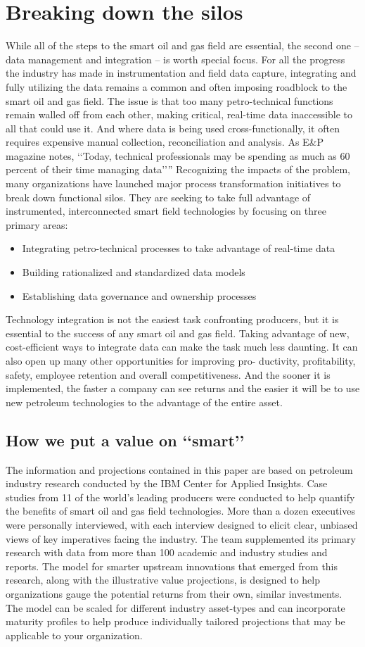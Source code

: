 \documentclass[twocolumn]{article}
\newcommand{\bi}{\begin{itemize}}
\newcommand{\ei}{\end{itemize}}
\newcommand{\ii}{\item}
\begin{document}
\section{Breaking down the silos}
While all of the steps to the smart oil and gas field are essential, the second one – data management and integration – is worth special focus. For all the progress the industry has made in instrumentation and field data capture, integrating and fully utilizing the data remains a common and often imposing roadblock to the smart oil and gas field.
The issue is that too many petro-technical functions remain walled off from each other, making critical, real-time data inaccessible to all that could use it. And where data is being used cross-functionally, it often requires expensive manual collection, reconciliation and analysis. As E\&P magazine notes, \lq\lq{}Today, technical professionals may be spending as much as 60 percent of their time managing data\rq\rq{}”
Recognizing the impacts of the problem, many organizations have launched major process transformation initiatives to break down functional silos. They are seeking to take full advantage of instrumented, interconnected smart field technologies by focusing on three primary areas:
\bi
\ii Integrating petro-technical processes to take advantage of real-time data
\ii  Building rationalized and standardized data models
\ii  Establishing data governance and ownership processes
\ei
Technology integration is not the easiest task confronting producers, but it is essential to the success of any smart oil and gas field. Taking advantage of new, cost-efficient ways
to integrate data can make the task much less daunting. It can also open up many other opportunities for improving pro- ductivity, profitability, safety, employee retention and overall competitiveness. And the sooner it is implemented, the faster a company can see returns and the easier it will be to use new petroleum technologies to the advantage of the entire asset.


\subsection{How we put a value on \lq\lq{}smart\rq\rq{}}
The information and projections contained in this paper are based on petroleum industry research conducted by the IBM Center for Applied Insights. Case studies from 11 of the world’s leading producers were conducted to help quantify the benefits of smart oil and gas field technologies. More than a dozen executives were personally interviewed, with each interview designed to elicit clear, unbiased views of key imperatives facing the industry.
The team supplemented its primary research with data from more than 100 academic and industry studies and reports. The model for smarter upstream innovations that emerged from this research, along with the illustrative value projections, is designed to help organizations gauge the potential returns from their own, similar investments. The model can be scaled for different industry asset-types and can incorporate maturity profiles to help produce individually tailored projections that may be applicable to your organization.
\end{document}
